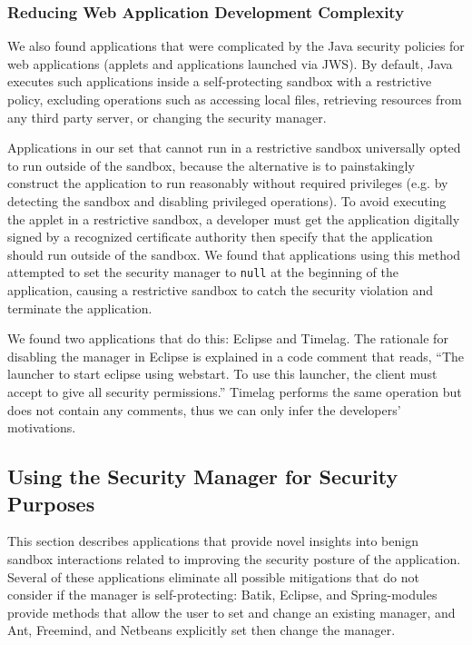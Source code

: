 \documentclass{sig-alternate}
\begin{document}
\subsubsection{Reducing Web Application Development Complexity}\label{sub:Reducing-Web-Application-Complexity}

We also found applications that were complicated by the Java security policies
for web applications (applets and applications launched via JWS). By default,
Java executes such applications inside a self-protecting 
sandbox with a restrictive policy, 
excluding operations such as accessing local files, retrieving resources
from any third party server, or changing the security manager. 

Applications in our set that cannot run in a restrictive sandbox universally
opted to run outside of the sandbox, because the alternative is to painstakingly
construct the application to run reasonably without required privileges (e.g. by
detecting the sandbox and disabling privileged operations). To avoid executing
the applet in a restrictive 
sandbox, a developer must get the application digitally signed
by a recognized certificate authority then specify that the application should
run outside of the sandbox. We found that applications using this method attempted
to set the security manager to \texttt{null} at the beginning of the
application, causing a restrictive sandbox to catch the security violation and
terminate the application.

We found two applications that do this: Eclipse and
Timelag. The rationale for disabling the manager in Eclipse is explained in a
code comment that reads, ``The launcher to start eclipse using webstart. To use
this launcher, the client must accept to give all security permissions.'' Timelag
performs the same operation but does not contain any comments, thus we can only
infer the developers' motivations. 

\subsection{Using the Security Manager for Security Purposes}
\label{sub:Using-the-Security}

This section describes applications that provide novel insights into benign sandbox interactions related to improving the security
posture of the application. Several of these applications eliminate all possible mitigations that do not consider if the manager is self-protecting: Batik, Eclipse, and Spring-modules provide
methods that allow the user to set and change an existing manager,
and Ant, Freemind, and Netbeans explicitly set then change the manager.
\end{document}
